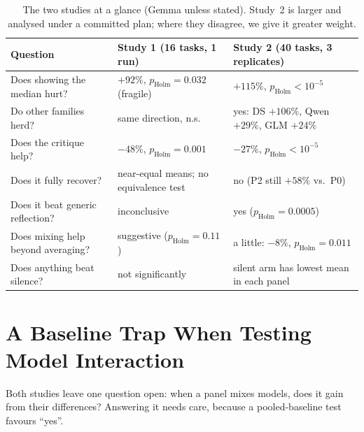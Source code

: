 \documentclass[10pt]{article}
\newenvironment{fittable}{\begin{lrbox}{\manuscripttable}}{%
\end{lrbox}\ifdim\wd\manuscripttable>\linewidth
\resizebox{\linewidth}{!}{\usebox{\manuscripttable}}%
\else\usebox{\manuscripttable}\fi}
\theoremstyle{manuscript}\newtheorem{proposition}{Proposition}
\newcommand{\pH}{p_{\text{Holm}}}
\begin{document}
\begin{table}[ht]\centering\small\setlength{\tabcolsep}{5pt}
\caption{The two studies at a glance (Gemma unless stated). Study~2 is larger and analysed under a committed plan; where they disagree, we give it greater weight.}\label{tab:glance}
\begin{fittable}
\begin{tabular}{@{}lll@{}}\toprule
Question & Study 1 (16 tasks, 1 run) & Study 2 (40 tasks, 3 replicates)\\\midrule
Does showing the median hurt? & $+92\%$, $\pH=0.032$ (fragile) & $+115\%$, $\pH<10^{-5}$\\
Do other families herd? & same direction, n.s. & yes: DS $+106\%$, Qwen $+29\%$, GLM $+24\%$\\
Does the critique help? & $-48\%$, $\pH=0.001$ & $-27\%$, $\pH<10^{-5}$\\
Does it fully recover? & near-equal means; no equivalence test & no (P2 still $+58\%$ vs.\ P0)\\
Does it beat generic reflection? & inconclusive & yes ($\pH=0.0005$)\\
Does mixing help beyond averaging? & suggestive ($\pH=0.11$) & a little: $-8\%$, $\pH=0.011$\\
Does anything beat silence? & not significantly & silent arm has lowest mean in each panel\\\bottomrule
\end{tabular}
\end{fittable}
\end{table}

\FloatBarrier\clearpage
\section{A Baseline Trap When Testing Model Interaction}\label{sec:jensen}
Both studies leave one question open: when a panel mixes models, does it gain from their differences? Answering it needs care, because a pooled-baseline test favours ``yes''.


\end{document}
